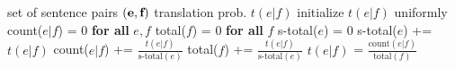 \documentclass[landscape]{slides}
\begin{document}

\begin{center} \vspace{-1mm}
\begin{multicols}{2}
\begin{algorithmic}[1]
\REQUIRE set of sentence pairs $(\text{\bf e},\text{\bf f})$
\ENSURE translation prob. $t(e|f)$
\STATE initialize $t(e|f)$ uniformly
  \STATE {}
  \STATE count($e|f$) = 0 {\bf for all} $e,f$
  \STATE total($f$) = 0 {\bf for all} $f$
    \STATE {}
      \STATE s-total($e$) = 0
        \STATE s-total($e$) += $t(e|f)$
      \ENDFOR
    \ENDFOR
    \STATE {}
        \STATE count($e|f$) += $\frac{t(e|f)}{\text{s-total}(e)}$
        \STATE total($f$)   += $\frac{t(e|f)}{\text{s-total}(e)}$
      \ENDFOR
    \ENDFOR
  \ENDFOR
  \STATE {}
      \STATE $t(e|f)$ = $\frac{\text{count}(e|f)}{\text{total}(f)}$
    \ENDFOR
  \ENDFOR
\ENDWHILE
\end{algorithmic}
\end{multicols}
\end{center}


\end{document}

